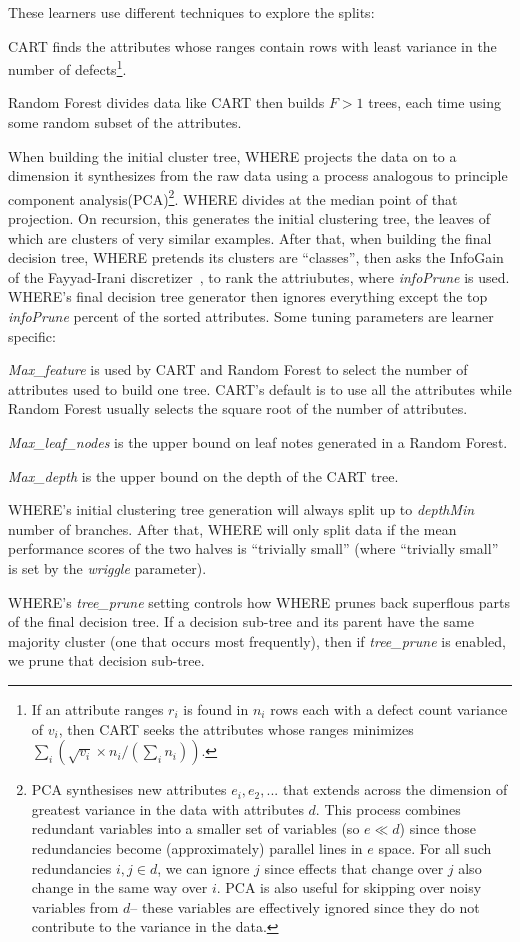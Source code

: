 These learners use different techniques to explore the splits:
\bi
\item
CART finds the attributes whose ranges contain rows with least variance in the number
of defects\footnote{If an attribute ranges $r_i$ is found in 
$n_i$ rows each with a  defect count variance of $v_i$, then CART seeks the attributes
whose ranges minimizes $\sum_i \left(\sqrt{v_i}\times n_i/(\sum_i n_i)\right)$.}.
\item
Random Forest    divides data like CART then  builds $F>1$  trees,
each time using some random subset of
the attributes. 
\item
When building the initial cluster tree, WHERE projects the data on to a dimension it synthesizes from the raw data using
a process analogous to principle component analysis(PCA)\footnote{
PCA  synthesises  new
attributes $e_i, e_2,...$
that extends across the dimension of greatest  variance in the data  with attributes $d$.  
This process  combines
redundant  variables into a smaller set of variables  (so $e \ll d$) since those
redundancies become (approximately) parallel lines
in $e$ space. For all such redundancies \mbox{$i,j \in d$}, we 
can ignore $j$ 
since effects that change over $j$ also
change in the same way over $i$.
PCA is also useful for skipping over noisy variables from $d$-- these
variables are effectively ignored since    they  do not contribute to the variance in the data.}.
WHERE  divides  at the median point of that projection.
On recursion,
this generates the initial clustering tree, the leaves of which are clusters of  very similar examples. After that, when building 
the final decision tree, WHERE pretends its clusters are ``classes'', then 
asks the InfoGain of the
Fayyad-Irani discretizer~\cite{FayIra93Multi}, to rank the attriubutes, where {\em infoPrune} is used.
WHERE's final decision tree generator then ignores everything except the top   {\em infoPrune} percent of the sorted
attributes.
\ei
Some tuning parameters are learner specific:
\bi
\item
{\em Max\_feature} is used by
CART and Random Forest to select the number of attributes
used to build one tree.
CART's default is to use all the attributes while 
Random Forest usually selects the square root of the number
of attributes.
\item
  {\em Max\_leaf\_nodes} is the upper bound on leaf notes generated in a 
  Random Forest.
\item {\em Max\_depth} is the upper bound on the depth of the CART tree.  
 \item
WHERE's initial clustering
tree generation will always split up to {\em depthMin} number of branches.
After that, WHERE will only split data if the mean performance scores of the two halves
is ``trivially small'' (where ``trivially small'' is set by the   {\em wriggle} parameter). 
\item
WHERE's   {\em tree\_prune} setting controls how   
WHERE prunes back superflous parts of the final decision tree. 
If a decision sub-tree and its parent have the same 
majority cluster
(one that occurs most frequently), then if {\em tree\_prune} is enabled, we prune that decision sub-tree.
\ei





